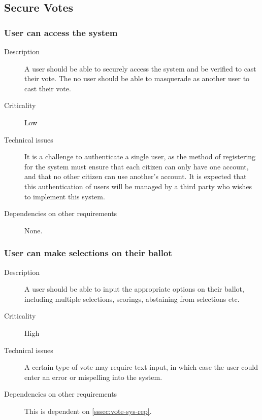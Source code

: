 \documentclass[a4paper,12pt]{article}
\begin{document}
\subsection{Secure Votes}
\label{subsec:securevote}

\subsubsection{User can access the system}
\begin{description}
	\item[Description]
		A user should be able to securely access the system and be verified to cast their vote. The no user should be able to masquerade as another user to cast their vote.
	\item[Criticality]
		Low
	\item[Technical issues]
		It is a challenge to authenticate a single user, as the method of registering for the system must ensure that each citizen can only have one account, and that no other citizen can use another's account. It is expected that this authentication of users will be managed by a third party who wishes to implement this system.
	\item[Dependencies on other requirements]
		None.
\end{description}

\subsubsection{User can make selections on their ballot}
\begin{description}
	\item[Description]
		A user should be able to input the appropriate options on their ballot, including multiple selections, scorings, abstaining from selections etc.
	\item[Criticality]
		High
	\item[Technical issues]
		A certain type of vote may require text input, in which case the user could enter an error or mispelling into the system.
	\item[Dependencies on other requirements]
		This is dependent on \ref{sssec:vote-sys-rep}.
\end{description}
\end{document}
